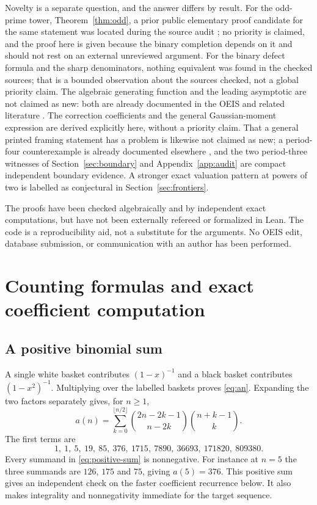\documentclass[11pt,a4paper]{article}
\numberwithin{equation}{section}
\theoremstyle{definition}
\theoremstyle{remark}
\begin{document}
Novelty is a separate question, and the answer differs by result. For the
odd-prime tower, Theorem~\ref{thm:odd}, a prior public elementary proof
candidate for the same statement was located during the source audit
\cite{prior}; no priority is claimed, and the proof here is given because the
binary completion depends on it and should not rest on an external unreviewed
argument. For the binary defect formula and the sharp denominators, nothing
equivalent was found in the checked sources; that is a bounded observation
about the sources checked, not a global priority claim. The algebraic
generating function and the leading asymptotic are not claimed as new: both
are already documented in the OEIS and related literature
\cite{oeis348410,niu,prodinger}. The correction coefficients and the general
Gaussian-moment expression are derived explicitly here, without a priority
claim. That a general printed framing statement has a problem is likewise not
claimed as new; a period-four counterexample is already documented elsewhere
\cite{priorcounter}, and the two period-three witnesses of
Section~\ref{sec:boundary} and Appendix~\ref{app:audit} are compact
independent boundary evidence. A stronger exact valuation pattern at powers
of two is labelled as conjectural in Section~\ref{sec:frontiers}.

The proofs have been checked algebraically and by independent exact
computations, but have not been externally refereed or formalized in Lean.
The code is a reproducibility aid, not a substitute for the arguments. No
OEIS edit, database submission, or communication with an author has been
performed.

\section{Counting formulas and exact coefficient computation}
\label{sec:coeff}

\subsection{A positive binomial sum}
A single white basket contributes $(1-x)^{-1}$ and a black basket contributes
$(1-x^2)^{-1}$. Multiplying over the labelled baskets proves
\eqref{eq:an}. Expanding the two factors separately gives, for $n\ge1$,
\begin{equation}\label{eq:positive-sum}
 a(n)=\sum_{k=0}^{\lfloor n/2\rfloor}
 \binom{2n-2k-1}{n-2k}\binom{n+k-1}{k}.
\end{equation}
The first terms are
\[
 1,\ 1,\ 5,\ 19,\ 85,\ 376,\ 1715,\ 7890,\ 36693,\ 171820,\ 809380.
\]
Every summand in \eqref{eq:positive-sum} is nonnegative. For instance at
$n=5$ the three summands are $126$, $175$ and $75$, giving $a(5)=376$.
This positive sum gives an independent check on the faster coefficient
recurrence below. It also makes integrality and nonnegativity immediate for
the target sequence.
\end{document}
